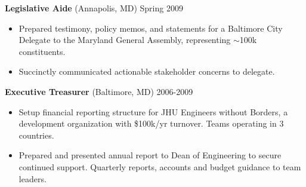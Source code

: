 \documentclass[margin]{res}
\newcommand{\locdatesubsection}[3]{\textbf{#1} (#2) \hfill #3}
\begin{document}
\begin{sloppypar}
\begin{resume}
\locdatesubsection{Legislative Aide}{Annapolis, MD}{Spring 2009}
\begin{itemize}
    \item Prepared testimony, policy memos, and statements for a Baltimore City Delegate to the Maryland General Assembly, representing $\sim$100k constituents.
    \item Succinctly communicated actionable stakeholder concerns to delegate.
\end{itemize}

\locdatesubsection{Executive Treasurer}{Baltimore, MD}{2006-2009}
    \begin{itemize}
        \item Setup financial reporting structure for JHU Engineers without Borders, a development organization with \$100k/yr turnover. Teams operating in 3 countries.
        \item Prepared and presented annual report to Dean of Engineering to secure continued support. Quarterly reports, accounts and budget guidance to team leaders.
    \end{itemize}



\end{resume}
\end{sloppypar}
\end{document}
